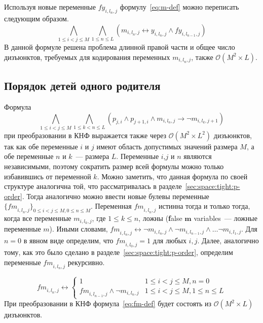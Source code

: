 Используя новые переменные $\mathit{fy}_{i,l_{n},j}$ формулу~\eqref{eq:m-def} можно переписать следующим образом.
%
\begin{equation}
\label{eq:m-def-tight}
  \bigwedge_{1 \leq i < j \leq M} \bigwedge_{1 \leq n \leq L} \left(m_{i,l_{n},j} \leftrightarrow y_{i,l_{n},j} \wedge \mathit{fy}_{i,l_{n - 1},j} \right)
\end{equation}
%
В данной формуле решена проблема длинной правой части и общее число дизъюнктов, требуемых для кодирования переменных $m_{i,l_{n},j}$, также $\mathcal{O}\left(M^{2} \times L\right)$. 


\subsection{Порядок детей одного родителя}
\label{sec:space:tight:m-order}

Формула
\begin{equation*}
\bigwedge_{1 \leq i < j \leq M} \bigwedge_{1 \leq k < n \leq L} \left(p_{j,i} \wedge p_{j + 1, i} \wedge m_{i,l_{n}, j} \rightarrow \neg m_{i, l_{k}, j + 1}\right)
\end{equation*}
при преобразовании в КНФ выражается также через $\mathcal{O}\left(M^{2} \times L^{2}\right)$ дизъюнктов, так как обе переменные $i$ и $j$ имеют область допустимых значений размера $M$, а обе переменные $n$ и $k$~{---} размера $L$.
Переменные $i$,$j$ и $n$ являются независимыми, поэтому сократить размер всей формулы можно только избавившись от переменной $k$.
Можно заметить, что данная формула по своей структуре аналогична той, что рассматривалась в разделе~\ref{sec:space:tight:p-order}.
Тогда аналогично можно ввести новые булевы переменные $\{\mathit{fm}_{i,l_{n},j}\}_{0 \leq i < j \leq M,0 \leq n \leq M}$.
Переменная $\mathit{fm}_{i,l_{n},j}$ истинна тогда и только тогда, когда все переменные $m_{i,l_{k},j}$, где $1 \leq k \leq n$, ложны (\textbf{f}alse $\boldsymbol{m}$ variables~{---} ложные переменные $m$).
Иными словами, $\mathit{fm}_{i,l_{n},j} \leftrightarrow \neg m_{i,l_{n},j} \wedge \neg m_{i, l_{n - 1}, j} \wedge \ldots \neg m_{i,l_{1},j}$. 
Для $n = 0$ в явном виде определим, что $\mathit{fm}_{i,l_{0},j} = 1$ для любых $i,j$.
Далее, аналогично тому, как это было сделано в разделе~\ref{sec:space:tight:p-order}, определим переменные $\mathit{fm}_{i,l_{n},j}$ рекурсивно.

\begin{equation}
\label{eq:fm-def}
  \mathit{fm}_{i,l_{n},j} \leftrightarrow 
    \begin{cases} 
      1                               & 1 \leq i < j \leq M, n = 0 \\
      \mathit{fm}_{i,l_{n - 1},j} \wedge \neg m_{i,l_{n},j}  & 1 \leq i < j \leq M, 1 \leq n \leq L
    \end{cases} 
\end{equation}
%
При преобразовании в КНФ формула~\eqref{eq:fm-def} будет состоять из $\mathcal{O}\left(M^{2} \times L\right)$ дизъюнктов.

